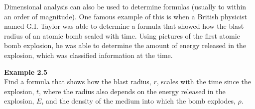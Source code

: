 Dimensional analysis can also be used to determine formulas (usually to within an order of magnitude). One famous example of this is when a British physicist named G.I. Taylor was able to determine a formula that showed how the blast radius of an atomic bomb scaled with time. Using pictures of the first atomic bomb explosion, he was able to determine the amount of energy released in the explosion, which was classified information at the time.

\begin{framed}
\textbf{Example 2.5}\\
Find a formula that shows how the blast radius, $r$, scales with the time since the explosion, $t$, where the radius also depends on the energy released in the explosion, $E$, and the density of the medium into which the bomb explodes, $\rho$.


\end{framed}
